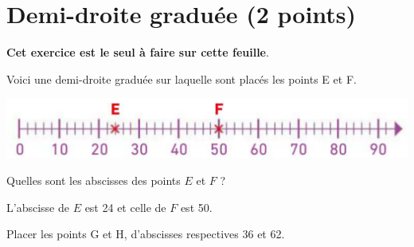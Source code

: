 \section{Demi-droite graduée (2 points)}

{\Large \textbf{Cet exercice est le seul à faire sur cette feuille}.} 

Voici une demi-droite graduée sur laquelle sont placés les points E et F.

\begin{center}
	\includegraphics[scale=0.55]{img/droites2}
\end{center}

\begin{questions}
	\question[1] Quelles sont les abscisses des points $E$ et $F$ ?
	\begin{solution}
		L'abscisse de $E$ est 24 et celle de $F$ est 50.
	\end{solution}
	
	\question[1] Placer les points G et H, d'abscisses respectives 36 et 62.
\end{questions}
